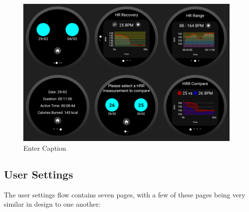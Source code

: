 \documentclass{l4proj}
\begin{document}
\begin{figure}[h!]
    \centering
    \includegraphics[width=1\linewidth]{dissertation//dissImages/HealthHistoryCombined.png}
    \caption{Enter Caption}
    \label{fig:enter-label}
\end{figure}

\subsection{User Settings}
\label{sec:usersettings}

The user settings flow contains seven pages, with a few of these pages being very similar in design to one another:
\end{document}
